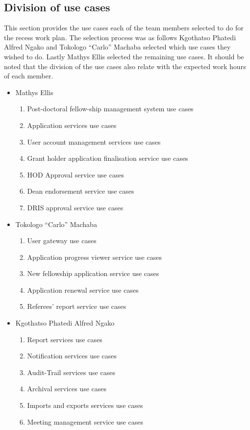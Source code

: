 \documentclass[12pt]{article}
\begin{document}
\subsection{Division of use cases}
This section provides the use cases each of the team members selected to do for the recess work plan. The selection process was as follows Kgothatso Phatedi Alfred Ngako and Tokologo “Carlo” Machaba selected which use cases they wished to do. Lastly Mathys Ellis selected the remaining use cases. It should be noted that the division of the use cases also relate with the expected work hours of each member.
\begin{itemize}
	\item Mathys Ellis
	\begin{enumerate}
		\item Post-doctoral fellow-ship management system use cases
		\item Application services use cases
		\item User account management services use cases
		\item Grant holder application finalisation service use cases
		\item HOD Approval service use cases
		\item Dean endorsement service use cases
		\item DRIS approval service use cases
	\end{enumerate}
	\item Tokologo “Carlo” Machaba
	\begin{enumerate}
		\item User gateway use cases
		\item Application progress viewer service use cases
		\item New fellowship application service use cases
		\item Application renewal service use cases
		\item Referees' report service use cases
	\end{enumerate}
	\item Kgothatso Phatedi Alfred Ngako
	\begin{enumerate}
		\item Report services use cases
		\item Notification services use cases
		\item Audit-Trail services use cases
		\item Archival services use cases
		\item Imports and exports services use cases
		\item Meeting management service use cases
	\end{enumerate}
\end{itemize}
\end{document}
